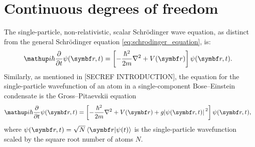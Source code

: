 




\section{Continuous degrees of freedom}\label{sec:continuous_dof}
The single-particle, non-relativistic, scalar Schr\"odinger wave equation, as distinct from the general Schr\"odinger equation \eqref{eq:schrodinger_equation}, is:
\begin{align}\label{eq:schrodinger_wave_equation}
\ii\hbar\pdv{}{t}\psi(\vec r, t) = \left[-\frac{\hbar^2}{2m} \nabla^2 + V(\vec r)\right]\psi(\vec r, t).
\end{align}
Similarly, as mentioned in [SECREF INTRODUCTION], the equation for the single-particle wavefunction of an atom in a single-component Bose--Einstein condensate is the Gross--Pitaevskii equation
\begin{align}
\ii\hbar\pdv{}{t}\psi(\vec r, t) = \left[-\frac{\hbar^2}{2m} \nabla^2 + V(\vec r) + g\abs{\psi(\vec r, t)}^2\right]\psi(\vec r, t),
\end{align}
where $\psi(\vec r, t) = \sqrt{N}\braket{\vec r}{\psi(t)}$ is the single-particle wavefunction scaled by the square root number of atoms $N$.


